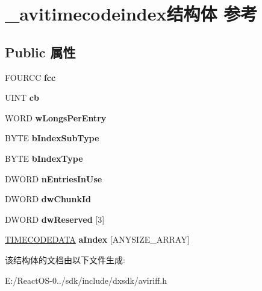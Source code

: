 \hypertarget{struct__avitimecodeindex}{}\section{\+\_\+avitimecodeindex结构体 参考}
\label{struct__avitimecodeindex}
\subsection*{Public 属性}
\begin{DoxyCompactItemize}
\item 
\mbox{\label{struct__avitimecodeindex_ab9ffea3a1250afc4482373de7c4240d0}} 
F\+O\+U\+R\+CC {\bfseries fcc}
\item 
\mbox{\label{struct__avitimecodeindex_a99e30b1c154e0e309cf1cda375ae8ae7}} 
U\+I\+NT {\bfseries cb}
\item 
\mbox{\label{struct__avitimecodeindex_a53978680c7492a0abeae2077927fb187}} 
W\+O\+RD {\bfseries w\+Longs\+Per\+Entry}
\item 
\mbox{\label{struct__avitimecodeindex_adc55dfed97afb5b86f6388a15b643f93}} 
B\+Y\+TE {\bfseries b\+Index\+Sub\+Type}
\item 
\mbox{\label{struct__avitimecodeindex_aa237f2d9c8f4e97ff02418294d6d2914}} 
B\+Y\+TE {\bfseries b\+Index\+Type}
\item 
\mbox{\label{struct__avitimecodeindex_a44dc27a204937c43e63bbd9428a32285}} 
D\+W\+O\+RD {\bfseries n\+Entries\+In\+Use}
\item 
\mbox{\label{struct__avitimecodeindex_a82328e07aa5567c700e2cd51cd141b32}} 
D\+W\+O\+RD {\bfseries dw\+Chunk\+Id}
\item 
\mbox{\label{struct__avitimecodeindex_ace0ed5ca4ff194756cfdf49932f69ead}} 
D\+W\+O\+RD {\bfseries dw\+Reserved} \mbox{[}3\mbox{]}
\item 
\mbox{\label{struct__avitimecodeindex_abaee8822ee76cecb225b6af6975bc9e4}} 
\hyperlink{struct__timecodedata}{T\+I\+M\+E\+C\+O\+D\+E\+D\+A\+TA} {\bfseries a\+Index} \mbox{[}A\+N\+Y\+S\+I\+Z\+E\+\_\+\+A\+R\+R\+AY\mbox{]}
\end{DoxyCompactItemize}


该结构体的文档由以下文件生成\+:\begin{DoxyCompactItemize}
\item 
E\+:/\+React\+O\+S-\/0../sdk/include/dxsdk/aviriff.\+h\end{DoxyCompactItemize}
